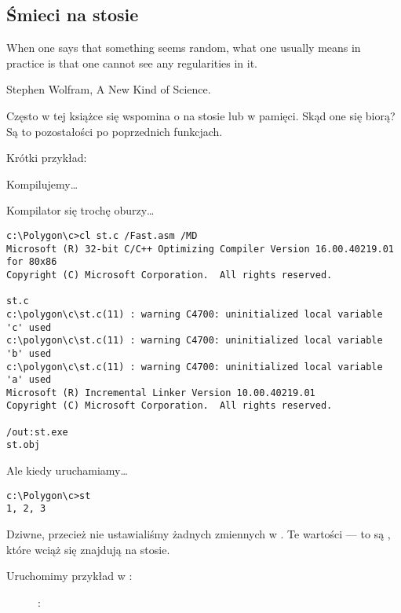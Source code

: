 \subsection{Śmieci na stosie}
\label{noise_in_stack}

\epigraph{When one says that something seems random, what one usually
means in practice is that one cannot see any regularities in it.}{Stephen Wolfram, A New Kind of Science.}

Często w tej książce się wspomina o  na stosie lub w pamięci.
Skąd one się biorą?
Są to pozostałości po poprzednich funkcjach.

Krótki przykład:



Kompilujemy\dots



Kompilator się trochę oburzy\dots

\begin{lstlisting}
c:\Polygon\c>cl st.c /Fast.asm /MD
Microsoft (R) 32-bit C/C++ Optimizing Compiler Version 16.00.40219.01 for 80x86
Copyright (C) Microsoft Corporation.  All rights reserved.

st.c
c:\polygon\c\st.c(11) : warning C4700: uninitialized local variable 'c' used
c:\polygon\c\st.c(11) : warning C4700: uninitialized local variable 'b' used
c:\polygon\c\st.c(11) : warning C4700: uninitialized local variable 'a' used
Microsoft (R) Incremental Linker Version 10.00.40219.01
Copyright (C) Microsoft Corporation.  All rights reserved.

/out:st.exe
st.obj
\end{lstlisting}

Ale kiedy uruchamiamy\dots

\begin{lstlisting}
c:\Polygon\c>st
1, 2, 3
\end{lstlisting}

Dziwne, przecież nie ustawialiśmy żadnych zmiennych w . 
Te wartości --- to są , które wciąż się znajdują na stosie.

\clearpage
Uruchomimy przykład w \olly:

\begin{figure}[H]
\centering
{}
\caption{\olly: }
\label{fig:stack_noise_olly1}
\end{figure}

